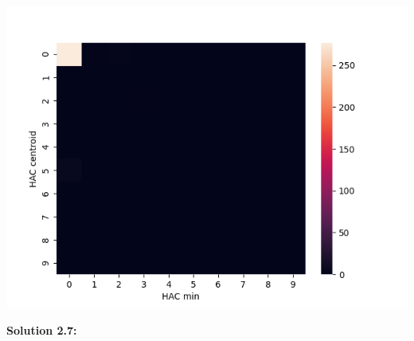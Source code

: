 \documentclass[submit]{harvardml}
\begin{document}
\begin{center}
    \includegraphics[scale=0.5]{HW4/2.6.6.png}
\end{center}

\noindent\textbf{Solution 2.7:}\\

\newpage
\end{document}

